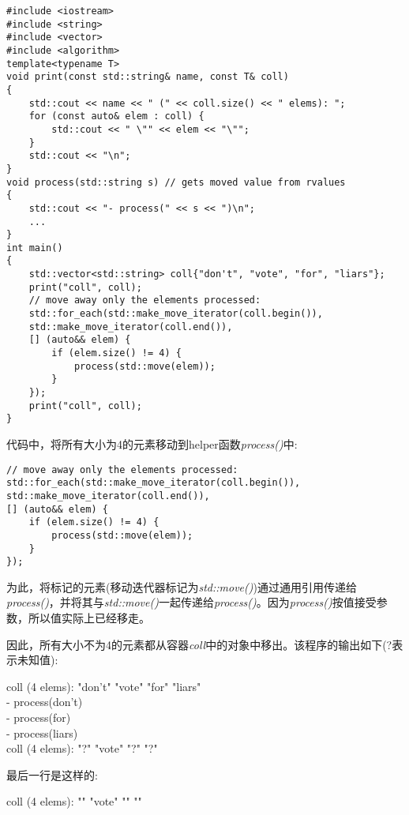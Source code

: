 \begin{lstlisting}[caption={}]
#include <iostream>
#include <string>
#include <vector>
#include <algorithm>
template<typename T>
void print(const std::string& name, const T& coll)
{
	std::cout << name << " (" << coll.size() << " elems): ";
	for (const auto& elem : coll) {
		std::cout << " \"" << elem << "\"";
	}
	std::cout << "\n";
}
void process(std::string s) // gets moved value from rvalues
{
	std::cout << "- process(" << s << ")\n";
	...
}
int main()
{
	std::vector<std::string> coll{"don't", "vote", "for", "liars"};
	print("coll", coll);
	// move away only the elements processed:
	std::for_each(std::make_move_iterator(coll.begin()),
	std::make_move_iterator(coll.end()),
	[] (auto&& elem) {
		if (elem.size() != 4) {
			process(std::move(elem));
		}
	});
	print("coll", coll);
}
\end{lstlisting}

代码中，将所有大小为4的元素移动到helper函数\textit{process()}中:\par

\begin{lstlisting}[caption={}]
// move away only the elements processed:
std::for_each(std::make_move_iterator(coll.begin()),
std::make_move_iterator(coll.end()),
[] (auto&& elem) {
	if (elem.size() != 4) {
		process(std::move(elem));
	}
});
\end{lstlisting}

为此，将标记的元素(移动迭代器标记为\textit{std::move()})通过通用引用传递给\textit{process()}，并将其与\textit{std::move()}一起传递给\textit{process()}。因为\textit{process()}按值接受参数，所以值实际上已经移走。\par

因此，所有大小不为4的元素都从容器\textit{coll}中的对象中移出。该程序的输出如下(?表示未知值):\par

\begin{tcolorbox}[colback=white,colframe=black]
coll (4 elems): "don't" "vote" "for" "liars" \\
- process(don't) \\
- process(for) \\
- process(liars) \\
coll (4 elems): "?" "vote" "?" "?"
\end{tcolorbox}

最后一行是这样的:\par

\begin{tcolorbox}[colback=white,colframe=black]
coll (4 elems): "" "vote" "" ""
\end{tcolorbox}

